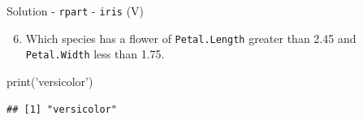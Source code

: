 \documentclass[
  10pt,
  ignorenonframetext,
]{beamer}
\newenvironment{Shaded}{}{}
\newcommand{\KeywordTok}[1]{\textcolor[rgb]{0.00,0.00,1.00}{#1}}
\newcommand{\NormalTok}[1]{#1}
\newcommand{\StringTok}[1]{\textcolor[rgb]{0.00,0.50,0.50}{#1}}
\providecommand{\tightlist}{%
  \setlength{\itemsep}{0pt}\setlength{\parskip}{0pt}}
\begin{document}
\begin{frame}[fragile]{Solution - \texttt{rpart} - \texttt{iris} (V)}
\protect\hypertarget{solution---rpart---iris-v}{}

\begin{enumerate}
[1)]
\setcounter{enumi}{5}
\tightlist
\item
  Which species has a flower of \texttt{Petal.Length} greater than 2.45
  and \texttt{Petal.Width} less than 1.75.
\end{enumerate}

\begin{Shaded}
\begin{Highlighting}[]
\KeywordTok{print}\NormalTok{(}\StringTok{'versicolor'}\NormalTok{)}
\end{Highlighting}
\end{Shaded}

\begin{verbatim}
## [1] "versicolor"
\end{verbatim}

\end{frame}
\end{document}
